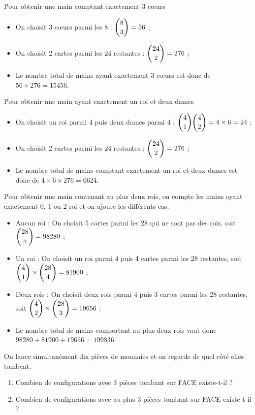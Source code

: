 \documentclass[11pt,fleqn, openany]{book} %
\begin{document}
\begin{solution}Pour obtenir une main comptant exactement 3 cœurs
\begin{itemize}
\item On choisit 3 cœurs parmi les 8 : $\dbinom{8}{3}=56$ ;
\item On choisit 2 cartes parmi les 24 restantes : $\dbinom{24}{2}=276$ ;
\item Le nombre total de mains ayant exactement 3 cœurs est donc de $56 \times 276 = 	15456$.
\end{itemize}

Pour obtenir une main ayant exactement un roi et deux dames
\begin{itemize}
\item On choisit un roi parmi 4 puis deux dames parmi 4 : $\dbinom{4}{1} \dbinom{4}{2}=4 \times 6 = 24$ ;
\item On choisit 2 cartes parmi les 24 restantes : $\dbinom{24}{2}=276$ ;
\item Le nombre total de mains comptant exactement un roi et deux dames est donc de $4 \times 6 \times 276=6624$.\end{itemize}

Pour obtenir une main contenant au plus deux rois, on compte les mains ayant exactement 0, 1 ou 2 roi et on ajoute les différents cas.
\begin{itemize}
\item Aucun roi : On choisit 5 cartes parmi les 28 qui ne sont pas des rois, soit $\dbinom{28}{5}=98280$ ;
\item Un roi : On choisit un roi parmi 4 puis 4 cartes parmi les 28 restantes, soit $\dbinom{4}{1} \times \dbinom{28}{4}=81900$ ;
\item Deux rois : On choisit deux rois parmi 4 puis 3 cartes parmi les 28 restantes, soit $\dbinom{4}{2} \times \dbinom{28}{3}=19656$ ;
\item Le nombre total de mains comportant au plus deux rois vaut donc $98280+81900+19656=199836$.
\end{itemize}\end{solution}





\begin{exercise}[topic=comb03]
On lance simultanément dix pièces de monnaies et on regarde de quel côté elles tombent.
\begin{enumerate}
\item Combien de configurations avec 3 pièces tombant sur FACE existe-t-il ?
\item Combien de configurations avec au plus 3 pièces tombant sur FACE existe-t-il ?
\end{enumerate}\end{exercise}
\end{document}

